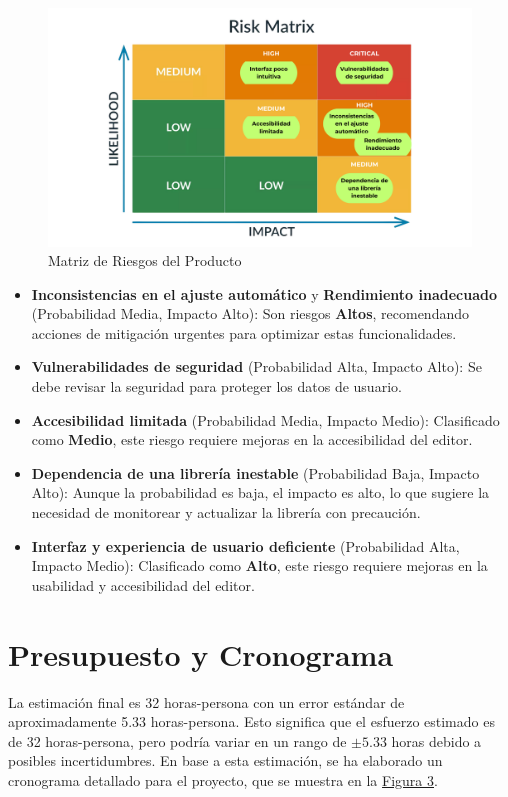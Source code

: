 \documentclass[stu, 12pt, letterpaper, donotrepeattitle, floatsintext, natbib]{apa7}
\begin{document}
\begin{figure}[!ht]
    \centering
    \caption{Matriz de Riesgos del Producto}
    \label{fig:product_risk_matrix}
    \includegraphics[width=\textwidth]{../imgs/producto.png}
\end{figure}

\begin{itemize}
    \item \textbf{Inconsistencias en el ajuste automático} y \textbf{Rendimiento inadecuado} (Probabilidad Media, Impacto Alto): Son riesgos \textbf{Altos}, recomendando acciones de mitigación urgentes para optimizar estas funcionalidades.
    \item \textbf{Vulnerabilidades de seguridad} (Probabilidad Alta, Impacto Alto): Se debe revisar la seguridad para proteger los datos de usuario.
    \item \textbf{Accesibilidad limitada} (Probabilidad Media, Impacto Medio): Clasificado como \textbf{Medio}, este riesgo requiere mejoras en la accesibilidad del editor.
    \item \textbf{Dependencia de una librería inestable} (Probabilidad Baja, Impacto Alto): Aunque la probabilidad es baja, el impacto es alto, lo que sugiere la necesidad de monitorear y actualizar la librería con precaución.
    \item \textbf{Interfaz y experiencia de usuario deficiente} (Probabilidad Alta, Impacto Medio): Clasificado como \textbf{Alto}, este riesgo requiere mejoras en la usabilidad y accesibilidad del editor.
\end{itemize}

\section{\large Presupuesto y Cronograma}
La estimación final es 32 horas-persona con un error estándar de aproximadamente 5.33 horas-persona. Esto significa que el esfuerzo estimado es de 32 horas-persona, pero podría variar en un rango de \(\pm 5.33\) horas debido a posibles incertidumbres. En base a esta estimación, se ha elaborado un cronograma detallado para el proyecto, que se muestra en la \hyperref[fig:cronograma]{Figura 3}.
\end{document}

